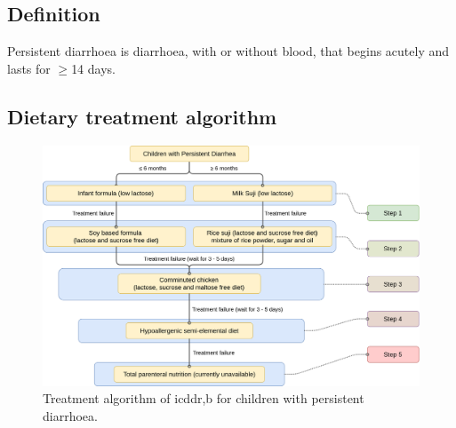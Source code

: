 \documentclass[11pt,a4paper]{report}
\begin{document}
\subsection{Definition}
Persistent diarrhoea is diarrhoea, with or without blood, that begins acutely and lasts for $\geq$14 days. \cite{who-pocketbook-2} 

\subsection{Dietary treatment algorithm}
\begin{figure}[htp]
	\centering \includegraphics[scale=0.22]{pd_algorithm.png}
	\centering \caption[PD treatment algorithm]{Treatment algorithm of icddr,b for children with persistent diarrhoea. \cite{mahfuz2017treatment}}
	\label{PD}
\end{figure}
\end{document}
